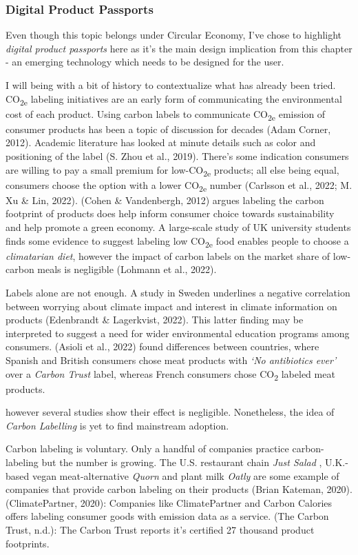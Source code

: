 \documentclass[
  letterpaper,
  DIV=11,
  numbers=noendperiod]{scrartcl}
\begin{document}
\subsubsection{Digital Product
Passports}\label{digital-product-passports}

Even though this topic belongs under Circular Economy, I've chose to
highlight \emph{digital product passports} here as it's the main design
implication from this chapter - an emerging technology which needs to be
designed for the user.

I will being with a bit of history to contextualize what has already
been tried. CO\textsubscript{2e} labeling initiatives are an early form
of communicating the environmental cost of each product. Using carbon
labels to communicate CO\textsubscript{2e} emission of consumer products
has been a topic of discussion for decades (Adam Corner, 2012). Academic
literature has looked at minute details such as color and positioning of
the label (S. Zhou et al., 2019). There's some indication consumers are
willing to pay a small premium for low-CO\textsubscript{2e} products;
all else being equal, consumers choose the option with a lower
CO\textsubscript{2e} number (Carlsson et al., 2022; M. Xu \& Lin, 2022).
(Cohen \& Vandenbergh, 2012) argues labeling the carbon footprint of
products does help inform consumer choice towards sustainability and
help promote a green economy. A large-scale study of UK university
students finds some evidence to suggest labeling low
CO\textsubscript{2e} food enables people to choose a \emph{climatarian
diet}, however the impact of carbon labels on the market share of
low-carbon meals is negligible (Lohmann et al., 2022).

Labels alone are not enough. A study in Sweden underlines a negative
correlation between worrying about climate impact and interest in
climate information on products (Edenbrandt \& Lagerkvist, 2022). This
latter finding may be interpreted to suggest a need for wider
environmental education programs among consumers. (Asioli et al., 2022)
found differences between countries, where Spanish and British consumers
chose meat products with \emph{`No antibiotics ever'} over a
\emph{Carbon Trust} label, whereas French consumers chose
CO\textsubscript{2} labeled meat products.

however several studies show their effect is negligible. Nonetheless,
the idea of \emph{Carbon Labelling} is yet to find mainstream adoption.

Carbon labeling is voluntary. Only a handful of companies practice
carbon-labeling but the number is growing. The U.S. restaurant chain
\emph{Just Salad} , U.K.-based vegan meat-alternative \emph{Quorn} and
plant milk \emph{Oatly} are some example of companies that provide
carbon labeling on their products (Brian Kateman, 2020).
(ClimatePartner, 2020): Companies like ClimatePartner and Carbon
Calories offers labeling consumer goods with emission data as a service.
(The Carbon Trust, n.d.): The Carbon Trust reports it's certified 27
thousand product footprints.
\end{document}
